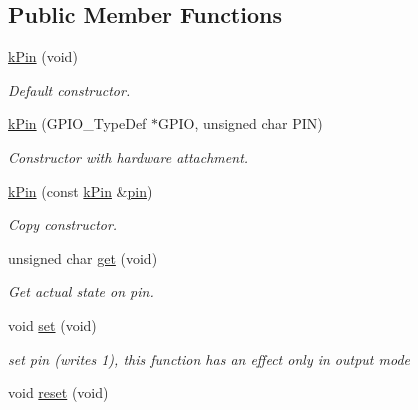 \subsection*{Public Member Functions}
\begin{DoxyCompactItemize}
\item 
\hyperlink{classkPin_a6298d5af7b3abb27ba12e91a926b124b}{k\+Pin} (void)\hypertarget{classkPin_a6298d5af7b3abb27ba12e91a926b124b}{}\label{classkPin_a6298d5af7b3abb27ba12e91a926b124b}

\begin{DoxyCompactList}\small\item\em Default constructor. \end{DoxyCompactList}\item 
\hyperlink{classkPin_ab566517aa9b1985a0c1093e193730c9d}{k\+Pin} (G\+P\+I\+O\+\_\+\+Type\+Def $\ast$G\+P\+IO, unsigned char P\+IN)
\begin{DoxyCompactList}\small\item\em Constructor with hardware attachment. \end{DoxyCompactList}\item 
\hyperlink{classkPin_a6c7f13462a99ba72e558cfcb389476f6}{k\+Pin} (const \hyperlink{classkPin}{k\+Pin} \&\hyperlink{classkPin_a0da283781fc832c77419bc71ff356cc1}{pin})
\begin{DoxyCompactList}\small\item\em Copy constructor. \end{DoxyCompactList}\item 
unsigned char \hyperlink{classkPin_a2ef21ca53fb82456997485b14bac45b0}{get} (void)
\begin{DoxyCompactList}\small\item\em Get actual state on pin. \end{DoxyCompactList}\item 
void \hyperlink{classkPin_a5f02fd984651e5a9e92bd3218d8e4bd0}{set} (void)\hypertarget{classkPin_a5f02fd984651e5a9e92bd3218d8e4bd0}{}\label{classkPin_a5f02fd984651e5a9e92bd3218d8e4bd0}

\begin{DoxyCompactList}\small\item\em set pin (writes 1), this function has an effect only in output mode \end{DoxyCompactList}\item 
void \hyperlink{classkPin_af6c53f90a2f1984bbfb045e75c14f933}{reset} (void)\hypertarget{classkPin_af6c53f90a2f1984bbfb045e75c14f933}{}\label{classkPin_af6c53f90a2f1984bbfb045e75c14f933}


\end{DoxyCompactItemize}
